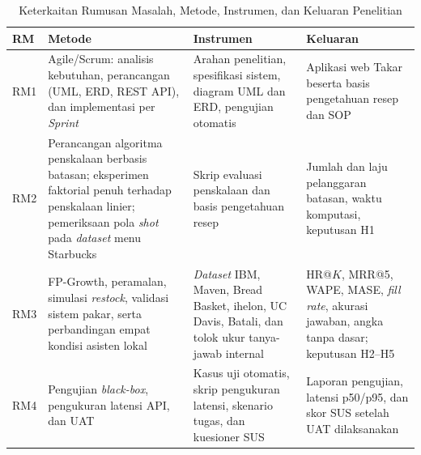 \begin{table}[!htb]
\centering
\caption{Keterkaitan Rumusan Masalah, Metode, Instrumen, dan Keluaran Penelitian}
\label{tab:rm-metode}
\small
\begin{tabular}{@{}>{\raggedright\arraybackslash}p{1.0cm}>{\raggedright\arraybackslash}p{4.3cm}>{\raggedright\arraybackslash}p{4.0cm}>{\raggedright\arraybackslash}p{3.9cm}@{}}
\toprule
RM & Metode & Instrumen & Keluaran \\
\midrule
RM1 & Agile/Scrum: analisis kebutuhan, perancangan (UML, ERD, REST API), dan implementasi per \textit{Sprint} & Arahan penelitian, spesifikasi sistem, diagram UML dan ERD, pengujian otomatis & Aplikasi web Takar beserta basis pengetahuan resep dan SOP \\
\addlinespace
RM2 & Perancangan algoritma penskalaan berbasis batasan; eksperimen faktorial penuh terhadap penskalaan linier; pemeriksaan pola \textit{shot} pada \textit{dataset} menu Starbucks & Skrip evaluasi penskalaan dan basis pengetahuan resep & Jumlah dan laju pelanggaran batasan, waktu komputasi, keputusan H1 \\
\addlinespace
RM3 & FP-Growth, peramalan, simulasi \textit{restock}, validasi sistem pakar, serta perbandingan empat kondisi asisten lokal & \textit{Dataset} IBM, Maven, Bread Basket, ihelon, UC Davis, Batali, dan tolok ukur tanya-jawab internal & HR@$K$, MRR@5, WAPE, MASE, \textit{fill rate}, akurasi jawaban, angka tanpa dasar; keputusan H2--H5 \\
\addlinespace
RM4 & Pengujian \textit{black-box}, pengukuran latensi API, dan UAT & Kasus uji otomatis, skrip pengukuran latensi, skenario tugas, dan kuesioner SUS & Laporan pengujian, latensi p50/p95, dan skor SUS setelah UAT dilaksanakan \\
\bottomrule
\end{tabular}
\end{table}


